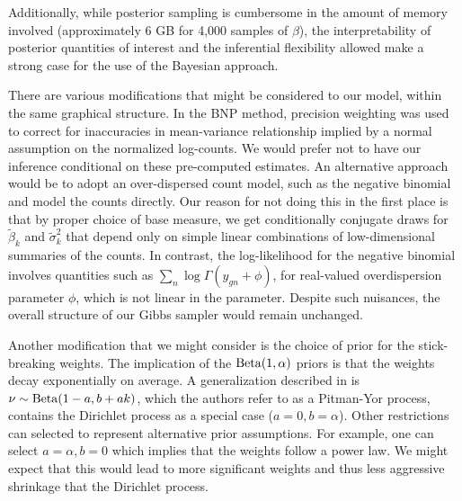 Additionally, while posterior sampling is cumbersome in the amount of memory involved (approximately 6 GB for 4,000 samples of $\beta$), the interpretability of posterior quantities of interest and the inferential flexibility allowed make a strong case for the use of the Bayesian approach.



There are various modifications that might be considered to our model, within the same graphical structure. In the BNP method, precision weighting was used to correct for inaccuracies in mean-variance relationship implied by a normal assumption on the normalized log-counts. We would prefer not to have our inference conditional on these pre-computed estimates. An alternative approach would be to adopt an over-dispersed count model, such as the negative binomial and model the counts directly. Our reason for not doing this in the first place is that by proper choice of base measure, we get conditionally conjugate draws for $\tilde{\beta}_k$ and $\tilde{\sigma}^2_k$ that depend only on simple linear combinations of low-dimensional summaries of the counts. In contrast, the log-likelihood for the negative binomial involves quantities such as $\sum_n \log \Gamma(y_{gn}+\phi)$, for real-valued overdispersion parameter $\phi$, which is not linear in the parameter. Despite such nuisances, the overall structure of our Gibbs sampler would remain unchanged.

Another modification that we might consider is the choice of prior for the stick-breaking weights. The implication of the $\operatorname{Beta}(1, \alpha)$ priors is that the weights decay exponentially on average. A generalization described in \cite{ishwaran2001} is $\nu \sim \operatorname{Beta}(1-a, b + ak)$, which the authors refer to as a Pitman-Yor process, contains the Dirichlet process as a special case ($a=0,b=\alpha$). Other restrictions can selected to represent alternative prior assumptions. For example, one can select $a=\alpha, b=0$ which implies that the weights follow a power law. We might expect that this would lead to more significant weights and thus less aggressive shrinkage that the Dirichlet process.


